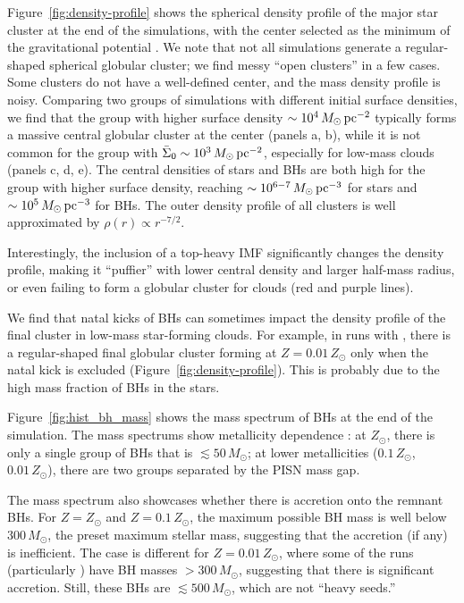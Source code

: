\documentclass[twocolumn]{aastex631}
\begin{document}
Figure~\ref{fig:density-profile} shows the spherical density profile of the major star cluster at the end of the simulations, with the center selected as the minimum of the gravitational potential \citep{GrudicGuszejnovHopkins_2018MNRAS.481..688G}. We note that not all simulations generate a regular-shaped spherical globular cluster; we find messy ``open clusters'' in a few cases. Some clusters do not have a well-defined center, and the mass density profile is noisy. Comparing two groups of simulations with different initial surface densities, we find that the group with higher surface density $\sim 10^4\,M_\odot\,{\rm pc}^{-2}$ typically forms a massive central globular cluster at the center (panels a, b), while it is not common for the group with $\bar\Sigma_0\sim 10^3\,M_\odot\,{\rm pc}^{-2}$, especially for low-mass clouds (panels c, d, e). The central densities of stars and BHs are both high for the group with higher surface density, reaching $\sim 10^{6-7}\,M_\odot\, {\rm pc}^{-3}$ for stars and $\sim 10^5\,M_\odot\, {\rm pc}^{-3}$ for BHs. The outer density profile of all clusters is well approximated by $\rho(r)\propto r^{-7/2}$.

Interestingly, the inclusion of a top-heavy IMF significantly changes the density profile, making it ``puffier'' with lower central density and larger half-mass radius, or even failing to form a globular cluster for  clouds (red and purple lines). 

We find that natal kicks of BHs can sometimes impact the density profile of the final cluster in low-mass star-forming clouds. For example, in runs with , there is a regular-shaped final globular cluster forming at $Z=0.01\,Z_\odot$ only when the natal kick is excluded (Figure~\ref{fig:density-profile}). This is probably due to the high mass fraction of BHs in the stars.

Figure~\ref{fig:hist_bh_mass} shows the mass spectrum of BHs at the end of the simulation. The mass spectrums show metallicity dependence \citep{CostaShepherdBressan_2025A&A...694A.193C}: at $Z_\odot$, there is only a single group of BHs that is $\lesssim 50\,M_\odot$; at lower metallicities ($0.1\,Z_\odot$, $0.01\,Z_\odot$), there are two groups separated by the PISN mass gap.

The mass spectrum also showcases whether there is accretion onto the remnant BHs. For $Z=Z_\odot$ and $Z=0.1\,Z_\odot$, the maximum possible BH mass is well below $300\,M_\odot$, the preset maximum stellar mass, suggesting that the accretion (if any) is inefficient. The case is different for $Z=0.01\,Z_\odot$, where some of the runs (particularly ) have BH masses $>300\,M_\odot$, suggesting that there is significant accretion. Still, these BHs are $\lesssim 500\,M_\odot$, which are not ``heavy seeds.''
\end{document}
